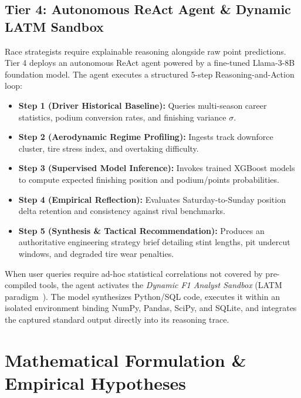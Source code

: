 \documentclass[journal]{IEEEtran}
\begin{document}
\subsection{Tier 4: Autonomous ReAct Agent \& Dynamic LATM Sandbox}
Race strategists require explainable reasoning alongside raw point predictions. Tier 4 deploys an autonomous ReAct agent powered by a fine-tuned Llama-3-8B foundation model. The agent executes a structured 5-step Reasoning-and-Action loop:
\begin{itemize}
    \item \textbf{Step 1 (Driver Historical Baseline):} Queries multi-season career statistics, podium conversion rates, and finishing variance $\sigma$.
    \item \textbf{Step 2 (Aerodynamic Regime Profiling):} Ingests track downforce cluster, tire stress index, and overtaking difficulty.
    \item \textbf{Step 3 (Supervised Model Inference):} Invokes trained XGBoost models to compute expected finishing position and podium/points probabilities.
    \item \textbf{Step 4 (Empirical Reflection):} Evaluates Saturday-to-Sunday position delta retention and consistency against rival benchmarks.
    \item \textbf{Step 5 (Synthesis \& Tactical Recommendation):} Produces an authoritative engineering strategy brief detailing stint lengths, pit undercut windows, and degraded tire wear penalties.
\end{itemize}

When user queries require ad-hoc statistical correlations not covered by pre-compiled tools, the agent activates the \textit{Dynamic F1 Analyst Sandbox} (LATM paradigm~\cite{cai2023latm}). The model synthesizes Python/SQL code, executes it within an isolated environment binding NumPy, Pandas, SciPy, and SQLite, and integrates the captured standard output directly into its reasoning trace.

\section{Mathematical Formulation \& Empirical Hypotheses}
\label{sec:formulation}
\end{document}
